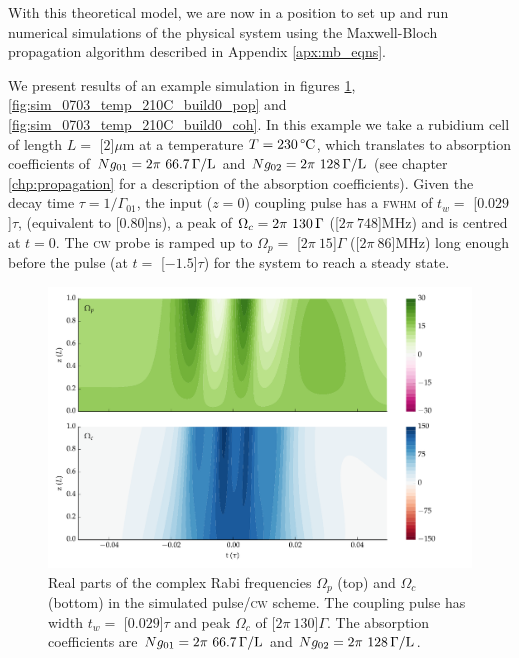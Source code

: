     With this theoretical model, we are now in a position to set up and run
    numerical simulations of the physical system using the Maxwell-Bloch
    propagation algorithm described in Appendix \ref{apx:mb_eqns}.

    We present results of an example simulation in figures
    \ref{fig:sim_0703_temp_210C_build0_fields},
    \ref{fig:sim_0703_temp_210C_build0_pop} and
    \ref{fig:sim_0703_temp_210C_build0_coh}. In this example we take a rubidium
    cell of length $L = $ \unit[$2$]{$\mu$m} at a temperature $T =
    \unit[230]{\textrm{\textdegree C}}$, which translates to absorption
    coefficients of $Ng_{01} = \unit[2\pi~66.7]{\Gamma/L}$ and $Ng_{02} =
    \unit[2\pi~128]{\Gamma/L}$ (see chapter \ref{chp:propagation} for a
    description of the absorption coefficients). Given the decay time $\tau =
    1/\Gamma_{01}$, the input ($z\!=\!0$) coupling pulse has a \textsc{fwhm} of
    $t_w = $ \unit[$0.029$]{$\tau$}, (equivalent to \unit[$0.80$]{ns}), a peak
    of $\Omega_c = \unit[2\pi~130]{\Gamma}$ (\unit[$2\pi~748$]{MHz}) and is
    centred at $t\!=\!0$. The \textsc{cw} probe is ramped up to $\Omega_p = $
    \unit[$2\pi~15$]{$\Gamma$} (\unit[$2\pi~86$]{MHz}) long enough before the
    pulse (at $t = $ \unit[$-1.5$]{$\tau$}) for the system to reach a steady
    state.

    \begin{figure}%
      \includegraphics[width=\linewidth]
        {figs/06_simultons/mb_vee2g_build0_15c_130p_0330t_230C_sb50_120vel000_00_002um_fig2.pdf}
      \caption{
      Real parts of the complex Rabi frequencies $\Omega_{p}$ (top) and
      $\Omega_{c}$ (bottom) in the simulated pulse/\textsc{cw} scheme. The
      coupling pulse has width $t_w = $ \unit[$0.029$]{$\tau$} and peak
      $\Omega_c$ of \unit[$2\pi~130$]{$\Gamma$}. The absorption coefficients are
      $Ng_{01} = \unit[2\pi~66.7]{\Gamma/L}$ and $Ng_{02} =
      \unit[2\pi~128]{\Gamma/L}$.
      }
      \label{fig:sim_0703_temp_210C_build0_fields}
    \end{figure}

